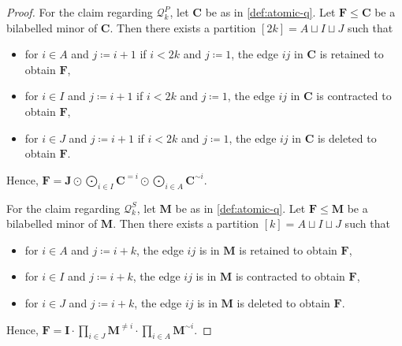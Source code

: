 \documentclass[a4paper,onecolumn,11pt,accepted=2026-01-06]{quantumarticle}
\theoremstyle{plain}
\theoremstyle{remark}
\theoremstyle{definition}
\begin{document}
\begin{proof}
	For the claim regarding $\mathcal{Q}_k^P$, 
	let $\boldsymbol{C}$ be as in \cref{def:atomic-q}.
	Let $\boldsymbol{F} \leq \boldsymbol{C}$ be a bilabelled minor of $\boldsymbol{C}$.
	Then there exists a partition $[2k] = A \sqcup I \sqcup J$ such that 
	\begin{itemize}
		\item for $i \in A$ and $j \coloneqq i+1$ if $i < 2k$ and $j \coloneqq 1$, the edge $ij$ in $\boldsymbol{C}$ is retained to obtain $\boldsymbol{F}$,
		\item for $i \in I$ and $j \coloneqq i+1$ if $i < 2k$ and $j \coloneqq 1$, the edge $ij$ in $\boldsymbol{C}$ is contracted to obtain $\boldsymbol{F}$,
		\item for $i \in J$ and $j \coloneqq i+1$ if $i < 2k$ and $j \coloneqq 1$, the edge $ij$ in $\boldsymbol{C}$ is deleted to obtain $\boldsymbol{F}$.
	\end{itemize}
	Hence, $\boldsymbol{F} = \boldsymbol{J} \odot \bigodot_{i\in I} \boldsymbol{C}^{=i} \odot \bigodot_{i \in A} \boldsymbol{C}^{\sim i}$.
	
	For the claim regarding $\mathcal{Q}_k^S$,
	let $\boldsymbol{M}$ be as in \cref{def:atomic-q}.
	Let $\boldsymbol{F} \leq \boldsymbol{M}$ be a bilabelled minor of $\boldsymbol{M}$.
	Then there exists a partition $[k] = A \sqcup I \sqcup J$ such that 
	\begin{itemize}
		\item for $i \in A$ and $j \coloneqq i+k$, the edge $ij$ is in $\boldsymbol{M}$ is retained to obtain $\boldsymbol{F}$,
		\item for $i \in I$ and $j \coloneqq i+k$, the edge $ij$ is in $\boldsymbol{M}$ is contracted to obtain $\boldsymbol{F}$,
		\item for $i \in J$ and $j \coloneqq i+k$, the edge $ij$ is in $\boldsymbol{M}$ is deleted to obtain $\boldsymbol{F}$.
	\end{itemize}
	Hence, $\boldsymbol{F} = \boldsymbol{I} \cdot \prod_{i \in J} \boldsymbol{M}^{\neq i} \cdot \prod_{i \in A} \boldsymbol{M}^{\sim i}$.
\end{proof}
\end{document}

